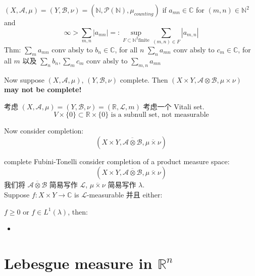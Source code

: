 \documentclass[lang=cn,11pt]{elegantbook}
\begin{document}
\begin{example}
    $(X, \mathcal{A}, \mu) = (Y , \mathcal{B}, \nu) = (\mathbb{N}, \mathcal{P}(\mathbb{N}), \mu_{counting})$
if $a_{mn} \in \mathbb{C}$ for $(m,n) \in \mathbb{N}^2$ and \[
\infty > \sum_{m,n} |a_{mn}| =: \sup_{F \subset \mathbb{N}^2  \text{finite}} \sum_{(m,n) \in F}  |a_{m,n}|
\]
Thm: $\sum_m a_{mn}$ conv absly to $b_n \in \mathbb{C}$, for all $n$
$\sum_n a_{mn}$ conv absly to $c_m \in \mathbb{C}$, for all $m$
以及 $\sum_n b_n, \sum_m c_m$ conv absly to $\sum_{m,n} a_{mn}$
\end{example}



Now suppose \((X, \mathcal{A}, \mu)\), $ (Y , \mathcal{B}, \nu)$ complete. Then \((X\times Y , \mathcal{A} \otimes \mathcal{B} , \mu\times \nu  )\) \textbf{may not be complete!}

\begin{example}
      考虑 $(X, \mathcal{A}, \mu) = (Y , \mathcal{B}, \nu) = (\mathbb{R}, \mathcal{L}, m)$
       考虑一个 Vitali set. \[
       V \times \{0\} \subset \mathbb{R} \times \{0\} \text{ is a subnull set, not measurable}
       \]
\end{example}



Now consider completion: \[
(X \times Y , \overline{\mathcal{A} \otimes \mathcal{B}},  \overline{\mu \times \nu}   ) 
\]



\begin{theorem}{complete Fubini-Tonelli}
 consider completion of a product measure space: \[
(X \times Y , \overline{\mathcal{A} \otimes \mathcal{B}},  \overline{\mu \times \nu}   ) 
\]
我们将 $\overline{\mathcal{A} \otimes \mathcal{B}}$ 简易写作 $\mathcal{L}$, $\overline{\mu \times \nu}   $ 简易写作 $\lambda$.\\
Suppose $f: X \times Y \to \mathbb{C}$ is $\mathcal{L}$-measurable 并且 either: 

$f \geq 0$ or $f \in L^1(\lambda)$, then: 
\begin{itemize}
    \item 
\end{itemize}

    
\end{theorem}



\section{Lebesgue measure in $\mathbb{R}^n$}
\end{document}
